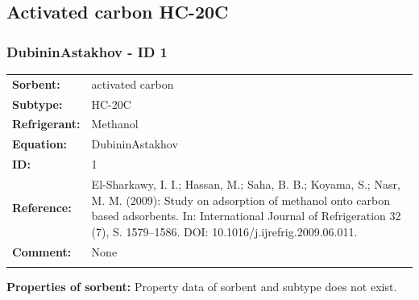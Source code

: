 \subsection{Activated carbon HC-20C}
%
\subsubsection{DubininAstakhov - ID 1}
%
\begin{tabular}[l]{|lp{11.5cm}|}
\hline
\addlinespace

\textbf{Sorbent:} & activated carbon \\
\textbf{Subtype:} & HC-20C \\
\textbf{Refrigerant:} & Methanol \\
\textbf{Equation:} & DubininAstakhov \\
\textbf{ID:} & 1 \\
\textbf{Reference:} & El-Sharkawy, I. I.; Hassan, M.; Saha, B. B.; Koyama, S.; Nasr, M. M. (2009): Study on adsorption of methanol onto carbon based adsorbents. In: International Journal of Refrigeration 32 (7), S. 1579–1586. DOI: 10.1016/j.ijrefrig.2009.06.011. \\
\textbf{Comment:} & None \\

\addlinespace
\hline
\end{tabular}
\newline

\textbf{Properties of sorbent:}
\newline
%
Property data of sorbent and subtype does not exist.


